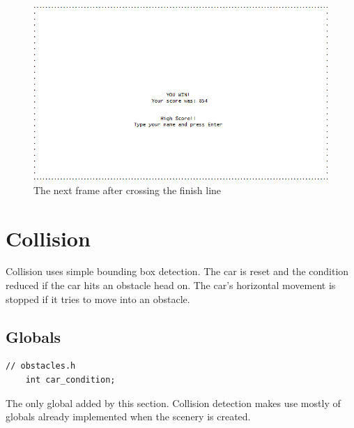 \documentclass{article}
\begin{document}
\begin{figure}[!ht]
	\begin{center}
	\includegraphics[width=0.63\paperwidth]{images/finishline_test_win2}
	\caption{The next frame after crossing the finish line}
	\label{fig:finishline_test_win2} 
	\end{center}
\end{figure}
\clearpage


\section{Collision}
Collision uses simple bounding box detection. The car is reset and the condition reduced if the car hits an obstacle head on. The car's horizontal movement is stopped if it tries to move into an obstacle. 

\subsection*{Globals}
\begin{lstlisting}[style=CStyle]
	// obstacles.h
	int car_condition;
\end{lstlisting}
The only global added by this section. Collision detection makes use mostly of globals already implemented when the scenery is created. 
\newline
\end{document}
